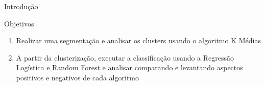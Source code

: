 \documentclass[final,hyperref={pdfpagelabels=false, brazil}]{beamer}
\begin{document}
\begin{frame}[t]
\begin{columns}[t]
\begin{column}{.465\textwidth}
\begin{block}{Introdu\c c\~ao}
\end{block}



\begin{block}{Objetivos}

\begin{enumerate}

\item Realizar uma segmentação e analisar os clusters usando o algoritmo K Médias 
\item A partir da clusterização, executar a classificação usando a Regressão Logística e Random Forest e analisar comparando e levantando aspectos positivos e negativos de cada algoritmo
\end{enumerate}

\end{block}







\end{column}
\end{columns}
\end{frame}
\end{document}
